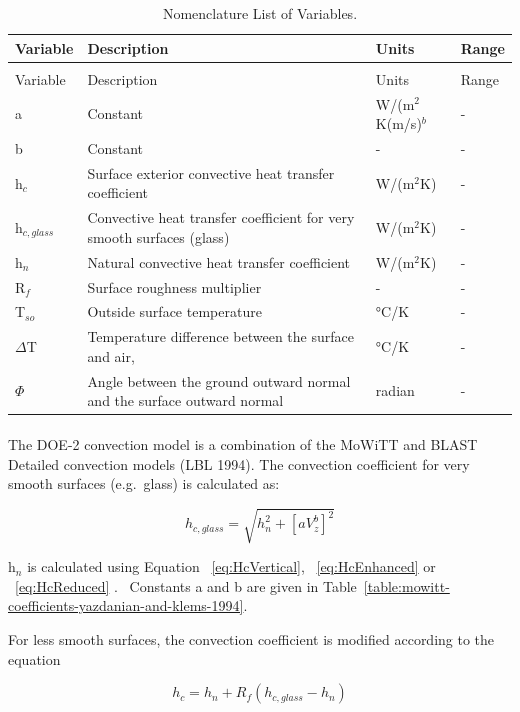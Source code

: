 \begin{longtable}[c]{p{0.5in}p{3.0in}p{1.5in}p{1.0in}}

\caption{Nomenclature List of Variables. \label{table:nomenclature-list-of-variables.-003}} \tabularnewline
\toprule 
Variable & Description & Units & Range \tabularnewline
\midrule
\endfirsthead

\caption[]{Nomenclature List of Variables.} \tabularnewline
\toprule 
Variable & Description & Units & Range \tabularnewline
\midrule
\endhead

a & Constant & W/(m\(^{2}\)K(m/s)\(^{b}\) & - \tabularnewline
b & Constant & - & - \tabularnewline
h\(_{c}\) & Surface exterior convective heat transfer coefficient & W/(m\(^{2}\)K) & - \tabularnewline
h\(_{c,glass}\) & Convective heat transfer coefficient for very smooth surfaces (glass) & W/(m\(^{2}\)K) & - \tabularnewline
h\(_{n}\) & Natural convective heat transfer coefficient & W/(m\(^{2}\)K) & - \tabularnewline
R\(_{f}\) & Surface roughness multiplier & - & - \tabularnewline
T\(_{so}\) & Outside surface temperature & °C/K & - \tabularnewline
$\Delta$T & Temperature difference between the surface and air, & °C/K & - \tabularnewline
$\Phi$ & Angle between the ground outward normal and the surface outward normal & radian & - \tabularnewline
\bottomrule
\end{longtable}

\paragraph{}\label{section}

The DOE-2 convection model is a combination of the MoWiTT and BLAST Detailed convection models (LBL 1994). The convection coefficient for very smooth surfaces (e.g.~glass) is calculated as:

\begin{equation}
{h_{c,glass}} = \sqrt {h_n^2 + {{\left[ {aV_z^b} \right]}^2}}
\end{equation}

h\(_{n}\) is calculated using Equation ~\ref{eq:HcVertical}, ~\ref{eq:HcEnhanced} or ~\ref{eq:HcReduced} .~ Constants a and b are given in Table~\ref{table:mowitt-coefficients-yazdanian-and-klems-1994}.

For less smooth surfaces, the convection coefficient is modified according to the equation

\begin{equation}
{h_c} = {h_n} + {R_f}({h_{c,glass}} - {h_n})
\end{equation}

